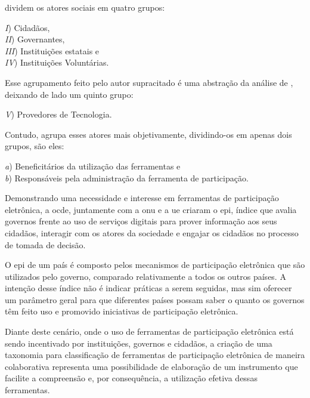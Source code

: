 \par
{} dividem os atores sociais em quatro grupos: 

\begin{minipage}{.66\textwidth}	
   \textit{I}) Cidadãos, \\
   \textit{II}) Governantes, \\
   \textit{III}) Instituições estatais e \\
   \textit{IV}) Instituições Voluntárias. \\
\end{minipage}

\par
Esse agrupamento feito pelo autor supracitado é uma abstração da análise de , deixando de lado um quinto grupo:

\par
\textit{V}) Provedores de Tecnologia.

\par
Contudo,  agrupa esses atores mais objetivamente, dividindo-os em apenas dois grupos, são eles:\\

\begin{minipage}{.75\textwidth}	
   \textit{a}) Beneficitários da utilização das ferramentas e \\
   \textit{b}) Responsáveis pela administração da ferramenta de participação.  \\
\end{minipage}

\par
Demonstrando uma necessidade e interesse em ferramentas de participação eletrônica, a \acrfull{ocde}, juntamente com a \acrshort{onu} e a \acrfull{ue} criaram o \acrfull{epi}, 
índice que avalia governos frente ao uso de serviços digitais para prover informação aos seus cidadãos, interagir com os atores da sociedade e engajar os cidadãos no processo 
de tomada de decisão. 

\par 
O \acrshort{epi} de um país é composto pelos mecanismos de participação eletrônica que são utilizados pelo governo, comparado relativamente a todos os outros países.
A intenção desse índice não é indicar práticas a serem seguidas, mas sim oferecer um parâmetro geral para que diferentes países possam saber o quanto os governos têm feito uso e promovido iniciativas de participação eletrônica.

\par
Diante deste cenário, onde o uso de ferramentas de participação eletrônica está sendo incentivado por instituições, governos e cidadãos, a criação de uma taxonomia para 
classificação de ferramentas de participação eletrônica de maneira colaborativa representa uma possibilidade de elaboração de um instrumento que facilite a compreensão e, por consequência, a utilização efetiva dessas ferramentas.


